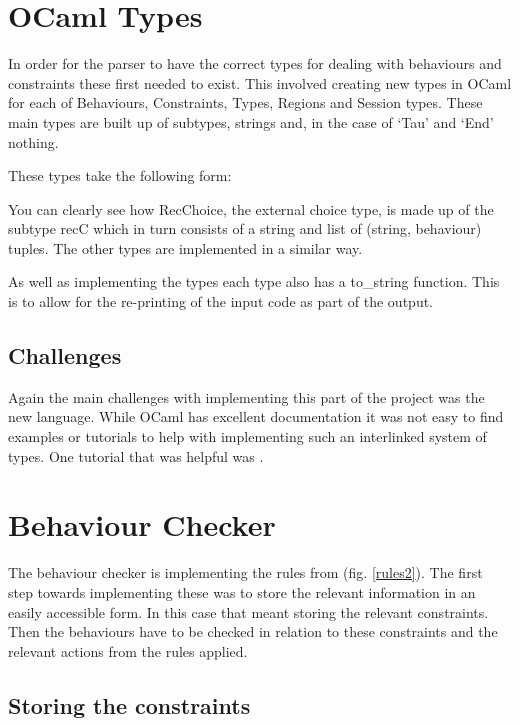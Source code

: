 \section{OCaml Types}

In order for the parser to have the correct types for dealing with behaviours and constraints these first needed to exist. This involved creating new types in OCaml for each of Behaviours, Constraints, Types, Regions and Session types. These main types are built up of subtypes, strings and, in the case of `Tau' and `End' nothing. 

These types take the following form: 



You can clearly see how RecChoice, the external choice type, is made up of the subtype recC which in turn consists of a string and list of (string, behaviour) tuples. The other types are implemented in a similar way. 

As well as implementing the types each type also has a to_string function. This is to allow for the re-printing of the input code as part of the output. 

\subsection{Challenges}

Again the main challenges with implementing this part of the project was the new language. While OCaml has excellent documentation it was not easy to find examples or tutorials to help with implementing such an interlinked system of types. One tutorial that was helpful was \cite{userTypes}.

\section{Behaviour Checker} \label{checker}

The behaviour checker is implementing the rules from (fig. \ref{rules2}). The first step towards implementing these was to store the relevant information in an easily accessible form. In this case that meant storing the relevant constraints. Then the behaviours have to be checked in relation to these constraints and the relevant actions from the rules applied. 

\subsection{Storing the constraints}

